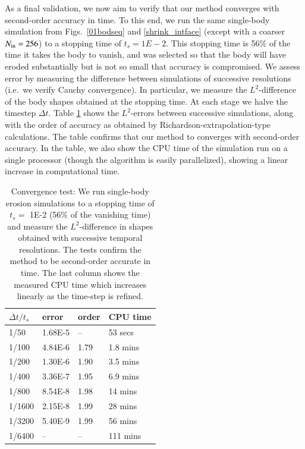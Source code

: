 \documentclass[preprint, 10pt]{elsarticle}
\begin{document}
As a final validation, we now aim to verify that our method converges with second-order accuracy in time. To this end, we run the same single-body simulation from Figs.~\ref{01bodseq} and \ref{shrink_intface} (except with a coarser $N_{\mathrm{in}}=256$) to a stopping time of $t_s = 1E-2$. This stopping time is 56\% of the time it takes the body to vanish, and was selected so that the body will have eroded substantially but is not so small that accuracy is compromised. We assess error by measuring the difference between simulations of successive resolutions (i.e.~we verify Cauchy convergence). In particular, we measure the $L^2$-difference of the body shapes obtained at the stopping time. At each stage we halve the timestep $\Delta t$. Table \ref{convtab} shows the $L^2$-errors between successive simulations, along with the order of accuracy as obtained by Richardson-extrapolation-type calculations. The table confirms that our method to converges with second-order accuracy. In the table, we also show the CPU time of the simulation run on a single processor (though the algorithm is easily parallelized), showing a linear increase in computational time.

\begin{table}%
\begin{center}
\caption{Convergence test: We run single-body erosion simulations to a stopping time of $t_s =$ 1E-2 (56\% of the vanishing time) and measure the $L^2$-difference in shapes obtained with successive temporal resolutions. The tests confirm the method to be second-order accurate in time. The last column shows the measured CPU time which increases linearly as the time-step is refined.
}
\vspace{0.3 pc}
\label{convtab}
\begin{tabular}{l l l l}
\hline
\hspace{0.0pc} $\Delta t/t_s$
\hspace{0.5pc} & error 
\hspace{0.5pc} & order
\hspace{0.5pc} & CPU time \\
\hline
%
1/50		& 1.68E-5		& --		& 53 secs     	\\
1/100	& 4.84E-6		& 1.79	& 1.8 mins   	\\
1/200	& 1.30E-6		& 1.90	& 3.5 mins  	\\
1/400	& 3.36E-7		& 1.95	& 6.9 mins  	\\
1/800	& 8.54E-8		& 1.98	& 14 mins   	\\
1/1600	& 2.15E-8		& 1.99	& 28 mins  	\\
1/3200	& 5.40E-9		& 1.99	& 56 mins    	\\
1/6400	& --			& --		& 111 mins	\\
%
\hline
\end{tabular}
\end{center}
\end{table}
\end{document}
